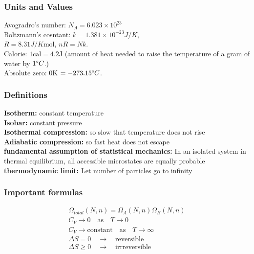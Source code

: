 \documentclass[a4paper, norsk, 8pt]{article}
\begin{document}
\tiny
\begin{multicols*}{3}
\subsubsection*{\scriptsize Units and Values}
Avogradro's number: $N_A=6.023\times 10^{23}$ \\
Boltzmann's cosntant: $k=1.381\times 10^{-23}J/K$,\\ $R = 8.31J/K\text{mol}$, $nR=Nk$.\\
Calorie: $1\text{cal} = 4.2$J (amount of heat needed to raise the temperature of a gram of water by $1\degree C$.)\\
Absolute zero: $0$K $=-273.15\degree C$.


\subsubsection*{\scriptsize Definitions}
\textbf{Isotherm:} constant temperature \\
\textbf{Isobar:} constant pressure \\
\textbf{Isothermal compression:} so slow that temperature does not rise \\
\textbf{Adiabatic compression:} so fast heat does not escape \\
\textbf{fundamental assumption of statistical mechanics:} In an isolated system in thermal equilibrium, all accessible microstates are equally probable\\
\textbf{thermodynamic limit:} Let number of particles go to infinity\\


\subsubsection*{\scriptsize Important formulas}
\begin{align*}
  \Omega_{total}(N, n) = \Omega_A(N, n)\Omega_B(N, n)\\
  C_V \rightarrow 0 \quad \text{as} \quad T \rightarrow 0 \\
  C_V \rightarrow \text{constant} \quad \text{as} \quad T \rightarrow \infty \\
  \Delta S = 0 \quad \rightarrow \quad \text{reversible} \\
  \Delta S \geq 0 \quad \rightarrow \quad \text{irrreversible} \\
\end{align*}


\end{multicols*}
\end{document}
